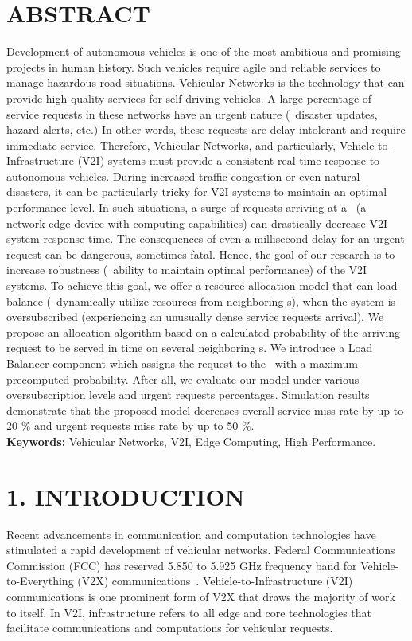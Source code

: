 \documentclass[11pt,a4paper]{article}
\begin{document}
\section*{\normalsize\uppercase{Abstract}}
Development of autonomous vehicles is one of the most ambitious and promising projects in human history. Such vehicles require agile and reliable services to manage hazardous road situations. Vehicular Networks is the technology that can provide high-quality services for self-driving vehicles. A large percentage of service requests in these networks have an urgent nature (\eg \ disaster updates, hazard alerts, etc.) In other words, these requests are delay intolerant and require immediate service. Therefore, Vehicular Networks, and particularly, Vehicle-to-Infrastructure (V2I) systems must provide a consistent real-time response to autonomous vehicles. During increased traffic congestion or even natural disasters, it can be particularly tricky for V2I systems to maintain an optimal performance level. In such situations, a surge of requests arriving at a \bs \ (a network edge device with computing capabilities) can drastically decrease V2I system response time. The consequences of even a millisecond delay for an urgent request can be dangerous, sometimes fatal. Hence, the goal of our research is to increase robustness (\ie \ ability to maintain optimal performance) of the V2I systems. To achieve this goal, we offer a resource allocation model that can load balance (\ie \ dynamically utilize resources from neighboring \bs s), when the system is oversubscribed (experiencing an unusually dense service requests arrival). We propose an allocation algorithm based on a calculated probability of the arriving request to be served in time on several neighboring \bs s. We introduce a Load Balancer component which assigns the request to the \bs \ with a maximum precomputed probability. After all, we evaluate our model under various oversubscription levels and urgent requests percentages. Simulation results demonstrate that the proposed model decreases overall service miss rate by up to 20 \% and urgent requests miss rate by up to 50 \%. \\

{\bf Keywords:} Vehicular Networks, V2I, Edge Computing, High Performance.


\section*{\normalsize\uppercase{1. Introduction}}\label{sec:intro}
Recent advancements in communication and computation technologies have stimulated a rapid development of vehicular networks. Federal Communications Commission (FCC) has reserved 5.850 to 5.925 GHz frequency band for Vehicle-to-Everything (V2X) communications~\cite{ali2011co}. Vehicle-to-Infrastructure (V2I) communications is one prominent form of V2X that draws the majority of work to itself. In V2I, infrastructure refers to all edge and core technologies that facilitate communications and computations for vehicular requests.
\end{document}

